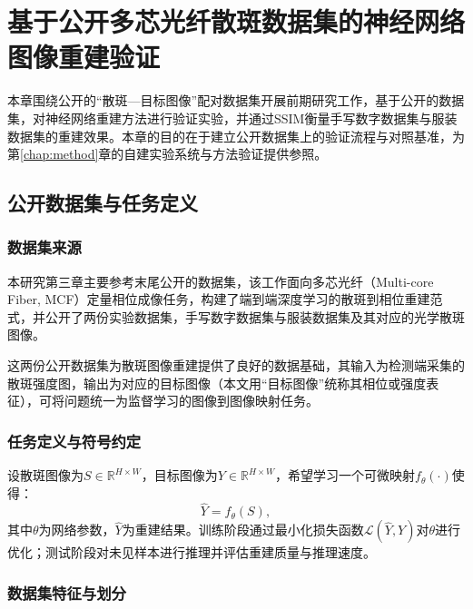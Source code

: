 
\chapter{基于公开多芯光纤散斑数据集的神经网络图像重建验证}\label{chap:preliminary}

{
本章围绕公开的“散斑—目标图像”配对数据集开展前期研究工作，基于\citet{sun2024ol_calibrationfree}公开的数据集，对神经网络重建方法进行验证实验，并通过SSIM衡量手写数字数据集与服装数据集的重建效果。本章的目的在于建立公开数据集上的验证流程与对照基准，为第\ref{chap:method}章的自建实验系统与方法验证提供参照。

\section{公开数据集与任务定义}\label{sec:public_dataset}

\subsection{数据集来源}\label{sec:dataset_source}

本研究第三章主要参考\citet{sun2024ol_calibrationfree}末尾公开的数据集\citep{sun2023_figshare_dataset1,sun2023_figshare_dataset2}，该工作面向多芯光纤（Multi-core Fiber, MCF）定量相位成像任务，构建了端到端深度学习的散斑到相位重建范式，并公开了两份实验数据集，手写数字数据集与服装数据集及其对应的光学散斑图像。

这两份公开数据集为散斑图像重建提供了良好的数据基础，其输入为检测端采集的散斑强度图，输出为对应的目标图像（本文用“目标图像”统称其相位或强度表征），可将问题统一为监督学习的图像到图像映射任务。

\subsection{任务定义与符号约定}\label{sec:task_definition}

设散斑图像为$S\in\mathbb{R}^{H\times W}$，目标图像为$Y\in\mathbb{R}^{H\times W}$，希望学习一个可微映射$f_{\theta}(\cdot)$使得：
\begin{equation}
\hat{Y} = f_{\theta}(S),
\end{equation}
其中$\theta$为网络参数，$\hat{Y}$为重建结果。训练阶段通过最小化损失函数$\mathcal{L}(\hat{Y}, Y)$对$\theta$进行优化；测试阶段对未见样本进行推理并评估重建质量与推理速度。

\subsection{数据集特征与划分}\label{sec:dataset_stats}

}
